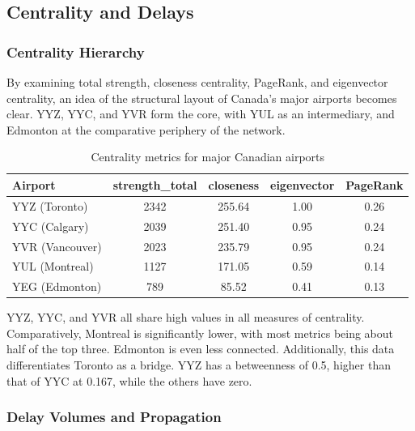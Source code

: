 \documentclass[10pt]{article}
\begin{document}
\subsection{Centrality and Delays}

\subsubsection{Centrality Hierarchy}

By examining total strength, closeness centrality, PageRank, and eigenvector centrality, an idea of the structural layout of Canada's major airports becomes clear. YYZ, YYC, and YVR form the core, with YUL as an intermediary, and Edmonton at the comparative periphery of the network.

\begin{table}[h!]
    \centering
    \caption{Centrality metrics for major Canadian airports}
    \begin{tabular}{lcccc}
        \toprule
        Airport & strength\_total & closeness & eigenvector & PageRank \\
        \midrule
        YYZ (Toronto)   & 2342 & 255.64 & 1.00 & 0.26 \\
        YYC (Calgary)   & 2039 & 251.40 & 0.95 & 0.24 \\
        YVR (Vancouver) & 2023 & 235.79 & 0.95 & 0.24 \\
        YUL (Montreal)  & 1127 & 171.05 & 0.59 & 0.14 \\
        YEG (Edmonton)  & 789  & 85.52  & 0.41 & 0.13 \\
        \bottomrule
    \end{tabular}
\end{table}


YYZ, YYC, and YVR all share high values in all measures of centrality. Comparatively, Montreal is significantly lower, with most metrics being about half of the top three. Edmonton is even less connected. Additionally, this data differentiates Toronto as a bridge. YYZ has a betweenness of 0.5, higher than that of YYC at 0.167, while the others have zero. 

\subsubsection{Delay Volumes and Propagation}
\end{document}
